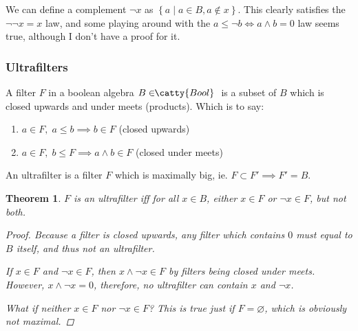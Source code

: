 \documentclass[]{article}
\newtheorem{theorem}{Theorem}
\newcommand{\setn}[1]{\left\{#1\right\}}
\newcommand{\cat}[1]{\ensuremath{\!\! \catty{#1} \,\,}}
\begin{document}
We can define a complement $\neg x$ as $\setn{a\;|\;a \in B, a \not \in x}$.
This clearly satisfies the $\neg \neg x = x$ law, and some playing around with
the $a \leq \neg b \iff a \wedge b = 0$ law seems true, although I don't have a
proof for it.

\subsubsection{Ultrafilters}

A filter $F$ in a boolean algebra $B \in \cat{Bool}$ is a subset of $B$ which is
closed upwards and under meets (products). Which is to say:

\begin{enumerate}
  \item{$a \in F,\; a \leq b \implies b \in F$ (closed upwards)}
  \item{$a \in F,\; b \leq F \implies a \wedge b \in F$ (closed under meets)}
\end{enumerate}

An ultrafilter is a filter $F$ which is maximally big, ie. $F \subset F'
\implies F' = B$.

\begin{theorem}
  $F$ is an ultrafilter iff for all $x \in B$, either $x \in F$ or $\neg x \in
  F$, but not both.
  \begin{proof}
    Because a filter is closed upwards, any filter which contains $0$ must equal
    to $B$ itself, and thus not an ultrafilter.

    If $x \in F$ and $\neg x \in F$, then $x \wedge \neg x \in F$ by filters
    being closed under meets. However, $x \wedge \neg x = 0$, therefore, no
    ultrafilter can contain $x$ and $\neg x$.

    What if neither $x \in F$ nor $\neg x \in F$? This is true just if $F =
    \varnothing$, which is obviously not maximal.
  \end{proof}
\end{theorem}
\end{document}
